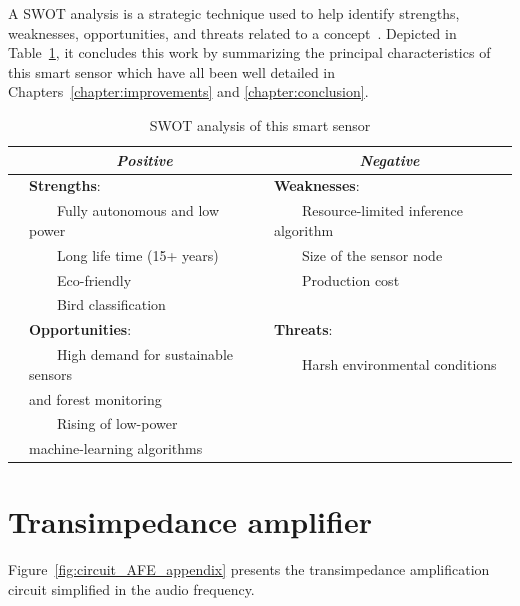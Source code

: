 \documentclass{EPL-master-thesis-covers-EN}
\newcommand{\tabitem}{~~\llap{\textbullet}~~}
\begin{document}
A SWOT analysis is a strategic technique used to help  identify strengths, weaknesses, opportunities, and threats related to a concept~\cite{HILL199746}. Depicted in Table~\ref{tab:SWOT}, it concludes this work by summarizing the principal characteristics of this smart sensor which have all been well detailed in Chapters~\ref{chapter:improvements} and \ref{chapter:conclusion}.

\begin{table}[H]
\centering
 \begin{tabular}{p{}|p{}|p{}}
 & \multicolumn{1}{c|}{\textit{Positive}} & \multicolumn{1}{c}{\textit{Negative}} \\ \midrule
 \parbox[t]{3mm}{} 
 & \textbf{Strengths}: & \textbf{Weaknesses}:\\
 & \tabitem Fully autonomous and low power & \tabitem Resource-limited inference algorithm\\
 & \tabitem Long life time (15+ years) & \tabitem Size of the sensor node\\
 & \tabitem Eco-friendly & \tabitem Production cost\\
 & \tabitem Bird classification & \\
 \midrule
\parbox[t]{3mm}{}
 & \textbf{Opportunities}: & \textbf{Threats}:\\
 & \tabitem High demand for sustainable sensors & \tabitem Harsh environmental conditions\\
 & \hspace{4mm} and forest monitoring & \\
 & \tabitem Rising of low-power & \\
 & \hspace{4mm} machine-learning algorithms & \\
 \end{tabular}
\caption{SWOT analysis of this smart sensor}
\label{tab:SWOT}
\end{table}


\appendix

\chapter{Transimpedance amplifier}
\label{appendix:transimpedance}

Figure~\ref{fig:circuit_AFE_appendix} presents the transimpedance amplification circuit simplified in the audio frequency.
\end{document}
